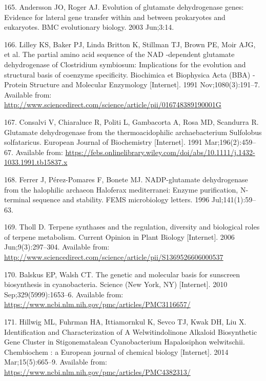 \documentclass[12pt,twoside]{reedthesis}
\begin{document}
  \hypertarget{ref-andersson_evolution_2003}{}
  165. Andersson JO, Roger AJ. Evolution of glutamate dehydrogenase genes:
  Evidence for lateral gene transfer within and between prokaryotes and
  eukaryotes. BMC evolutionary biology. 2003 Jun;3:14.
  
  \hypertarget{ref-lilley_partial_1991}{}
  166. Lilley KS, Baker PJ, Linda Britton K, Stillman TJ, Brown PE, Moir
  AJG, et al. The partial amino acid sequence of the NAD -dependent
  glutamate dehydrogenase of Clostridium symbiosum: Implications for the
  evolution and structural basis of coenzyme specificity. Biochimica et
  Biophysica Acta (BBA) - Protein Structure and Molecular Enzymology
  {[}Internet{]}. 1991 Nov;1080(3):191--7. Available from:
  \url{http://www.sciencedirect.com/science/article/pii/016748389190001G}
  
  \hypertarget{ref-consalvi_glutamate_1991}{}
  167. Consalvi V, Chiaraluce R, Politi L, Gambacorta A, Rosa MD,
  Scandurra R. Glutamate dehydrogenase from the thermoacidophilic
  archaebacterium Sulfolobus solfataricus. European Journal of
  Biochemistry {[}Internet{]}. 1991 Mar;196(2):459--67. Available from:
  \url{https://febs.onlinelibrary.wiley.com/doi/abs/10.1111/j.1432-1033.1991.tb15837.x}
  
  \hypertarget{ref-ferrer_nadp-glutamate_1996}{}
  168. Ferrer J, Pérez-Pomares F, Bonete MJ. NADP-glutamate dehydrogenase
  from the halophilic archaeon Haloferax mediterranei: Enzyme
  purification, N-terminal sequence and stability. FEMS microbiology
  letters. 1996 Jul;141(1):59--63.
  
  \hypertarget{ref-tholl_terpene_2006}{}
  169. Tholl D. Terpene synthases and the regulation, diversity and
  biological roles of terpene metabolism. Current Opinion in Plant Biology
  {[}Internet{]}. 2006 Jun;9(3):297--304. Available from:
  \url{http://www.sciencedirect.com/science/article/pii/S1369526606000537}
  
  \hypertarget{ref-balskus_genetic_2010}{}
  170. Balskus EP, Walsh CT. The genetic and molecular basis for sunscreen
  biosynthesis in cyanobacteria. Science (New York, NY) {[}Internet{]}.
  2010 Sep;329(5999):1653--6. Available from:
  \url{https://www.ncbi.nlm.nih.gov/pmc/articles/PMC3116657/}
  
  \hypertarget{ref-hillwig_identification_2014}{}
  171. Hillwig ML, Fuhrman HA, Ittiamornkul K, Sevco TJ, Kwak DH, Liu X.
  Identification and Characterization of A Welwitindolinone Alkaloid
  Biosynthetic Gene Cluster in Stigonematalean Cyanobacterium Hapalosiphon
  welwitschii. Chembiochem : a European journal of chemical biology
  {[}Internet{]}. 2014 Mar;15(5):665--9. Available from:
  \url{https://www.ncbi.nlm.nih.gov/pmc/articles/PMC4382313/}
  
\end{document}
